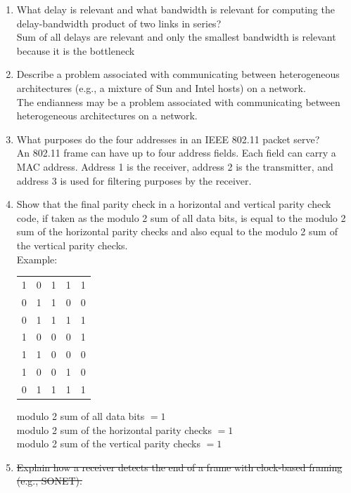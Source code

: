 \documentclass[10pt, a4paper]{article}
\begin{document}
\begin{enumerate}
    \color{black}
\item\mbox{}What delay is relevant and what bandwidth is relevant for computing the delay-bandwidth product of two links in series?\\
    \color{blue}
    Sum of all delays are relevant and only the smallest bandwidth is relevant because it is the bottleneck
    \color{black}
\item\mbox{}Describe a problem associated with communicating between heterogeneous architectures (e.g., a mixture of Sun and Intel hosts) on a network.\\
    \color{blue}
    The endianness may be a problem associated with communicating between heterogeneous architectures on a network.
    \color{black}
\item\mbox{}What purposes do the four addresses in an IEEE 802.11 packet serve?\\
    \color{blue}
    An 802.11 frame can have up to four address fields. Each field can carry a MAC address. Address 1 is the receiver, address 2 is the transmitter, and address 3 is used for filtering purposes by the receiver.
    \color{black}
\item\mbox{}Show that the final parity check in a horizontal and vertical parity check code, if taken as the modulo 2 sum of all data bits, is equal to the modulo 2 sum of the horizontal parity checks and also equal to the modulo 2 sum of the vertical parity checks.\\
    \color{blue}
    Example:\\
    \begin{tabular}{cccc|c}
        1 & 0 & 1 & 1 & 1\\
        0 & 1 & 1 & 0 & 0\\
        0 & 1 & 1 & 1 & 1\\
        1 & 0 & 0 & 0 & 1\\
        1 & 1 & 0 & 0 & 0\\
        1 & 0 & 0 & 1 & 0\\
        \hline
        0 & 1 & 1 & 1 & 1\\
    \end{tabular}
    modulo 2 sum of all data bits $= 1$\\
    modulo 2 sum of the horizontal parity checks $= 1$\\
    modulo 2 sum of the vertical parity checks $= 1$\\
    \color{black}
\item\mbox{} \sout{Explain how a receiver detects the end of a frame with clock-based framing (e.g., SONET).}

\end{enumerate}
\end{document}
